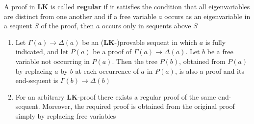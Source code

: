 \documentclass[11pt]{article}
\def \LK {\textbf{LK}}
\begin{document}
\begin{definition}[]
A proof in \(\LK\) is called \textbf{regular} if it satisfies the condition that all
eigenvariables are distinct from one another and if a free variable \(a\)
occurs as an eigenvariable in a sequent \(S\) of the proof, then \(a\) occurs
only in sequents above \(S\)
\end{definition}

\begin{lemma}[]
\label{lemma2.9}
\begin{enumerate}
\item Let \(\Gamma(a)\to\Delta(a)\) be an (\(\LK\)-)provable sequent in which \(a\)
is fully indicated, and let \(P(a)\) be a proof of \(\Gamma(a)\to\Delta(a)\).
Let \(b\) be a free variable not occurring in \(P(a)\). Then the tree
\(P(b)\), obtained from \(P(a)\) by replacing \(a\) by \(b\) at each
occurrence of \(a\) in \(P(a)\), is also a proof and its end-sequent is \(\Gamma(b)\to\Delta(b)\)
\item For an arbitrary \(\LK\)-proof there exists a regular proof of the same
end-sequent. Moreover, the required proof is obtained from the original
proof simply by replacing free variables
\end{enumerate}
\end{lemma}
\end{document}
